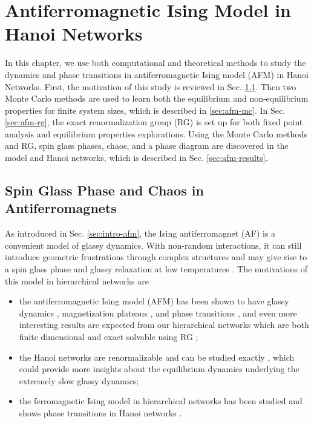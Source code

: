\chapter{Antiferromagnetic Ising Model  in Hanoi Networks}
\label{chap-afm}

In this chapter, we use both computational and theoretical methods to study the dynamics and phase transitions in antiferromagnetic Ising model (AFM) in Hanoi Networks.  First, the motivation of this study is reviewed in Sec. \ref{sec:amf-glass-intro}. Then two Monte Carlo methods are used to learn both the equilibrium and non-equilibrium properties for finite system sizes, which is described in \ref{sec:afm-mc}. In Sec. \ref{sec:afm-rg}, the exact renormalization group (RG) is set up for both fixed point analysis and equilibrium properties explorations.  Using the Monte Carlo methods and RG, spin glass phases, chaos, and a phase diagram are discovered in the model and Hanoi networks, which is described in Sec. \ref{sec:afm-results}.  

\section{Spin Glass Phase and Chaos in Antiferromagnets}
\label{sec:amf-glass-intro}
As introduced in Sec. \ref{sec:intro-afm}, the Ising antiferromagnet (AF) is a convenient model of glassy dynamics. With non-random interactions, it can still introduce geometric frustrations through complex structures and may give rise to a spin glass phase and glassy relaxation at low temperatures \cite{villain1977spin, herrero2008afm}. The motivations of this model in hierarchical networks are
\begin{itemize}
\item the antiferromagnetic Ising model (AFM) has been shown to have glassy dynamics \cite{shokef2011}, magnetization plateaus \cite{ohanyan2003mag} , and phase transitions \cite{herrero2008afm}, and even more interesting results are expected from our hierarchical networks which are both finite dimensional and exact solvable using RG ;
\item the Hanoi networks are renormalizable and can be studied exactly \cite{boettcher2015classification, Boettcher2011HNNP}, which could provide more insights about the equilibrium dynamics underlying the extremely slow glassy dynamics;
\item the ferromagnetic Ising model in hierarchical networks has been studied  and shows phase transitions in Hanoi networks \cite{brunson2014rg}.
\end{itemize}

